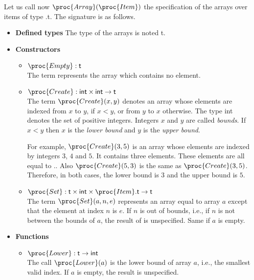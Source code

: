 \documentclass[11pt,a4paper]{article}
\newcommand\type[1]{\textsf{#1}}
\begin{document}
\noindent Let us call now \(\proc{Array}(\proc{Item})\) the
specification of the arrays over items of type
.\type{t}. The signature is as follows.
\begin{itemize}

  \item \textbf{Defined types}
  The type of the arrays is noted \type{t}.

  \item \textbf{Constructors}
  \begin{itemize}

    \item \(\proc{Empty} : \type{t}\)\\
    The term  represents the array which contains no
    element.

    \item \(\proc{Create} : \type{int} \times \type{int} \rightarrow
    \type{t}\)\\
    The term \(\proc{Create} (x, y)\) denotes an array whose
    elements are indexed from \(x\) to \(y\), if \(x < y\),
    or from \(y\) to \(x\) otherwise. The type \type{int} denotes
    the set of positive integers. Integers \(x\) and \(y\) are
    called \emph{bounds}. If \(x < y\) then \(x\) is the
    \emph{lower bound} and \(y\) is the \emph{upper bound}.

    For example, \(\proc{Create}(3, 5)\) is an array whose elements
    are indexed by integers \(3\), \(4\) and \(5\). It contains three
    elements. These elements are all equal to
    .. Also \(\proc{Create} (5, 3)\) is the
    same as \(\proc{Create} (3, 5)\). Therefore, in both cases, the
    lower bound is \(3\) and the upper bound is \(5\).

    \item \(\proc{Set} : \type{t} \times \type{int} \times
    \proc{Item}.\type{t} \rightarrow \type{t}\)\\
    The term \(\proc{Set} (a, n, e)\) represents an
    array equal to array \(a\) except that the element at index
    \(n\) is \(e\). If \(n\) is out of bounds, i.e., if \(n\) is
    not between the bounds of \(a\), the result of  is
    unspecified. Same if \(a\) is empty.

  \end{itemize}

  \item \textbf{Functions}
  \begin{itemize}

    \item \(\proc{Lower} : \type{t} \rightarrow \type{int}\)\\
    The call \(\proc{Lower} (a)\) is the lower bound of array
    \(a\), i.e., the smallest valid index. If \(a\) is empty, the
    result is unspecified.


\end{itemize}
\end{itemize}
\end{document}
